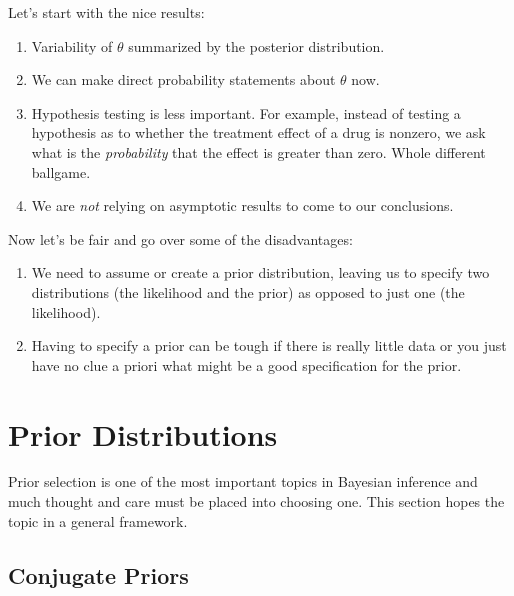 \documentclass[12pt]{article}
\begin{document}
Let's start with the nice results:
\begin{enumerate}
   \item{Variability of $\theta$ summarized by the posterior 
      distribution.}
   \item{We can make direct probability statements about $\theta$ now.}
   \item{Hypothesis testing is less important.  For example, instead
      of testing a hypothesis as to whether the treatment effect of a 
      drug is nonzero, we ask what is the \emph{probability} that
      the effect is greater than zero. Whole different ballgame.}
   \item{We are \emph{not} relying on asymptotic results to come
      to our conclusions.}
\end{enumerate}
Now let's be fair and go over some of the disadvantages:
\begin{enumerate}
   \item{We need to assume or create a prior distribution, leaving
      us to specify two distributions (the likelihood and the 
      prior) as opposed to just one (the likelihood).
   }
   \item{Having to specify a prior can be tough if there is really
      little data or you just have no clue a priori what might
      be a good specification for the prior.}
\end{enumerate}

\newpage

\section{Prior Distributions}

Prior selection is one of the most important topics in Bayesian inference
and much thought and care must be placed into choosing one. This section
hopes the topic in a general framework.


\subsection{Conjugate Priors}
\end{document}
